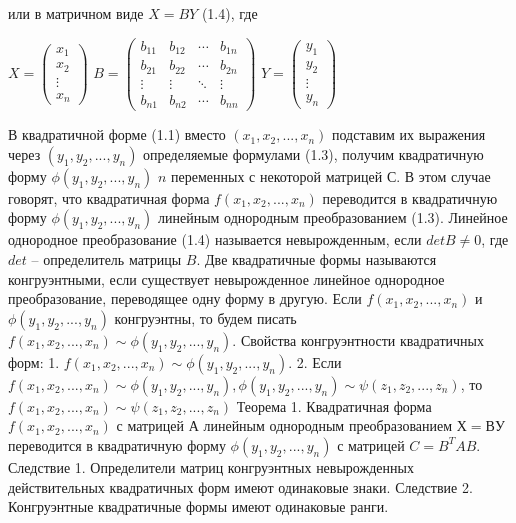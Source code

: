 \documentclass[bachelor, och, coursework, times]{SCWorks}
\newcommand\tab[1][1cm]{\hspace*{#1}}
\newcommand{\tl}{\newline\tab}
\begin{document}
или в матричном виде $X=BY$ (1.4), где  \newline
\begin{center}
$X = \begin{pmatrix}
x_{1}  \\
x_{2} \\        
\vdots \\
x_{n}
\end{pmatrix}$
$B = \begin{pmatrix}
b_{11} & b_{12} & \cdots & b_{1n} \\
b_{21} & b_{22} & \cdots & b_{2n} \\        
\vdots & \vdots & \ddots & \vdots \\
b_{n1} & b_{n2} & \cdots & b_{nn}
\end{pmatrix}$
$Y = \begin{pmatrix}
y_{1}  \\
y_{2} \\        
\vdots \\
y_{n}
\end{pmatrix}$
\end{center}
\tab
В квадратичной форме (1.1) вместо $(x_1, x_2,...,x_n)$ подставим их выражения через $(y_1, y_2,...,y_n)$ определяемые формулами (1.3), получим квадратичную форму $\phi (y_1, y_2,...,y_n)$ $n$ переменных с некоторой матрицей $С$. В этом случае говорят, что квадратичная форма $f(x_1, x_2,...,x_n)$ переводится в квадратичную форму $\phi(y_1, y_2,...,y_n)$ линейным однородным преобразованием (1.3). Линейное однородное преобразование (1.4) называется невырожденным, если $det B \ne 0$, где $det$ – определитель матрицы $B$.
\tl
Две квадратичные формы называются конгруэнтными, если существует невырожденное линейное однородное преобразование, переводящее одну форму в другую. Если $f(x_1, x_2,...,x_n)$ и $\phi(y_1, y_2,...,y_n)$ конгруэнтны, то будем писать $f(x_1, x_2,...,x_n) \sim \phi(y_1, y_2,...,y_n)$. Свойства конгруэнтности квадратичных форм:
\tl
1.  $f(x_1, x_2,...,x_n) \sim \phi(y_1, y_2,...,y_n)$.
\tl
2. Если $f(x_1, x_2,...,x_n) \sim \phi(y_1, y_2,...,y_n), \phi(y_1, y_2,...,y_n) \sim \psi(z_1,z_2,...,z_n)$, то $f(x_1, x_2,...,x_n) \sim \psi(z_1,z_2,...,z_n)$
\tl
Теорема 1. Квадратичная форма $f(x_1, x_2,...,x_n)$ с матрицей $А$ линейным однородным преобразованием $Х = ВУ$ переводится в квадратичную форму $\phi(y_1, y_2,...,y_n)$ с матрицей $C=B^{T}AB$.
\tl
Следствие 1. Определители матриц конгруэнтных невырожденных действительных квадратичных форм имеют одинаковые знаки.
\tl
Следствие 2. Конгруэнтные квадратичные формы имеют одинаковые ранги.
\end{document}
